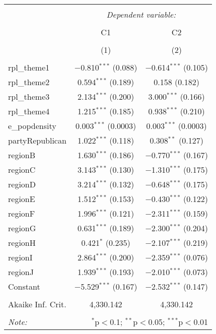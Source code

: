 
\begin{table}[!htbp] \centering 
  \caption{} 
  \label{} 
\begin{tabular}{@{\extracolsep{5pt}}lcc} 
\\[-1.8ex]\hline 
\hline \\[-1.8ex] 
 & \multicolumn{2}{c}{\textit{Dependent variable:}} \\ 
\cline{2-3} 
\\[-1.8ex] & C1 & C2 \\ 
\\[-1.8ex] & (1) & (2)\\ 
\hline \\[-1.8ex] 
 rpl\_theme1 & $-$0.810$^{***}$ (0.088) & $-$0.614$^{***}$ (0.105) \\ 
  rpl\_theme2 & 0.594$^{***}$ (0.189) & 0.158 (0.182) \\ 
  rpl\_theme3 & 2.134$^{***}$ (0.200) & 3.000$^{***}$ (0.166) \\ 
  rpl\_theme4 & 1.215$^{***}$ (0.185) & 0.938$^{***}$ (0.210) \\ 
  e\_popdensity & 0.003$^{***}$ (0.0003) & 0.003$^{***}$ (0.0003) \\ 
  partyRepublican & 1.022$^{***}$ (0.118) & 0.308$^{**}$ (0.127) \\ 
  regionB & 1.630$^{***}$ (0.186) & $-$0.770$^{***}$ (0.167) \\ 
  regionC & 3.143$^{***}$ (0.130) & $-$1.310$^{***}$ (0.175) \\ 
  regionD & 3.214$^{***}$ (0.132) & $-$0.648$^{***}$ (0.175) \\ 
  regionE & 1.512$^{***}$ (0.153) & $-$0.430$^{***}$ (0.122) \\ 
  regionF & 1.996$^{***}$ (0.121) & $-$2.311$^{***}$ (0.159) \\ 
  regionG & 0.631$^{***}$ (0.189) & $-$2.300$^{***}$ (0.204) \\ 
  regionH & 0.421$^{*}$ (0.235) & $-$2.107$^{***}$ (0.219) \\ 
  regionI & 2.864$^{***}$ (0.200) & $-$2.359$^{***}$ (0.076) \\ 
  regionJ & 1.939$^{***}$ (0.193) & $-$2.010$^{***}$ (0.073) \\ 
  Constant & $-$5.529$^{***}$ (0.167) & $-$2.532$^{***}$ (0.147) \\ 
 \hline \\[-1.8ex] 
Akaike Inf. Crit. & 4,330.142 & 4,330.142 \\ 
\hline 
\hline \\[-1.8ex] 
\textit{Note:}  & \multicolumn{2}{r}{$^{*}$p$<$0.1; $^{**}$p$<$0.05; $^{***}$p$<$0.01} \\ 
\end{tabular} 
\end{table} 
